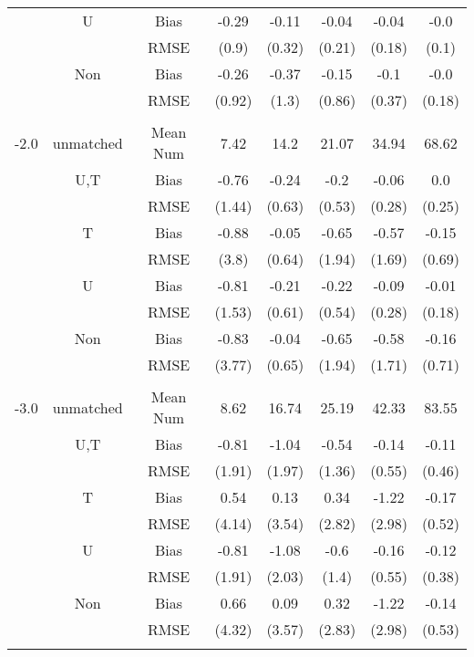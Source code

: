 \begin{tabular}{@{\extracolsep{5pt}}lc|cccccc}
 & U & Bias & -0.29 & -0.11 & -0.04 & -0.04 & -0.0 \\
 &  & RMSE & (0.9) & (0.32) & (0.21) & (0.18) & (0.1) \\
 & Non & Bias & -0.26 & -0.37 & -0.15 & -0.1 & -0.0 \\
 &  & RMSE & (0.92) & (1.3) & (0.86) & (0.37) & (0.18) \\
 &  &  &  &  &  &  &  \\
-2.0 & unmatched & Mean Num & 7.42 & 14.2 & 21.07 & 34.94 & 68.62 \\
 & U,T & Bias & -0.76 & -0.24 & -0.2 & -0.06 & 0.0 \\
 &  & RMSE & (1.44) & (0.63) & (0.53) & (0.28) & (0.25) \\
 & T & Bias & -0.88 & -0.05 & -0.65 & -0.57 & -0.15 \\
 &  & RMSE & (3.8) & (0.64) & (1.94) & (1.69) & (0.69) \\
 & U & Bias & -0.81 & -0.21 & -0.22 & -0.09 & -0.01 \\
 &  & RMSE & (1.53) & (0.61) & (0.54) & (0.28) & (0.18) \\
 & Non & Bias & -0.83 & -0.04 & -0.65 & -0.58 & -0.16 \\
 &  & RMSE & (3.77) & (0.65) & (1.94) & (1.71) & (0.71) \\
 &  &  &  &  &  &  &  \\
-3.0 & unmatched & Mean Num & 8.62 & 16.74 & 25.19 & 42.33 & 83.55 \\
 & U,T & Bias & -0.81 & -1.04 & -0.54 & -0.14 & -0.11 \\
 &  & RMSE & (1.91) & (1.97) & (1.36) & (0.55) & (0.46) \\
 & T & Bias & 0.54 & 0.13 & 0.34 & -1.22 & -0.17 \\
 &  & RMSE & (4.14) & (3.54) & (2.82) & (2.98) & (0.52) \\
 & U & Bias & -0.81 & -1.08 & -0.6 & -0.16 & -0.12 \\
 &  & RMSE & (1.91) & (2.03) & (1.4) & (0.55) & (0.38) \\
 & Non & Bias & 0.66 & 0.09 & 0.32 & -1.22 & -0.14 \\
 &  & RMSE & (4.32) & (3.57) & (2.83) & (2.98) & (0.53) \\
 &  &  &  &  &  &  &  \\
\hline 
\bottomrule 
\end{tabular}
